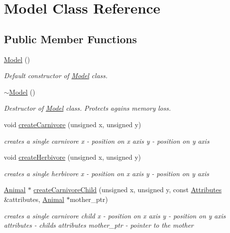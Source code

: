 \hypertarget{class_model}{}\section{Model Class Reference}
\label{class_model}
\subsection*{Public Member Functions}
\begin{DoxyCompactItemize}
\item 
\hyperlink{class_model_ae3b375de5f6df4faf74a95d64748e048}{Model} ()
\begin{DoxyCompactList}\small\item\em Default constructor of \hyperlink{class_model}{Model} class. \end{DoxyCompactList}\item 
\hyperlink{class_model_ad6ebd2062a0b823db841a0b88baac4c0}{$\sim$\+Model} ()
\begin{DoxyCompactList}\small\item\em Destructor of \hyperlink{class_model}{Model} class. Protects agains memory loss. \end{DoxyCompactList}\item 
void \hyperlink{class_model_aa6ac184b9cbcceddbe5a44c97cfdd618}{create\+Carnivore} (unsigned x, unsigned y)
\begin{DoxyCompactList}\small\item\em creates a single carnivore  x -\/ position on x axis  y -\/ position on y axis \end{DoxyCompactList}\item 
void \hyperlink{class_model_a26eee2f12fc902ea98e53001c0d1c4ea}{create\+Herbivore} (unsigned x, unsigned y)
\begin{DoxyCompactList}\small\item\em creates a single herbivore  x -\/ position on x axis  y -\/ position on y axis \end{DoxyCompactList}\item 
\hyperlink{class_animal}{Animal} $\ast$ \hyperlink{class_model_a8b359acfc61eb24f4b005a8782970616}{create\+Carnivore\+Child} (unsigned x, unsigned y, const \hyperlink{class_attributes}{Attributes} \&attributes, \hyperlink{class_animal}{Animal} $\ast$mother\+\_\+ptr)
\begin{DoxyCompactList}\small\item\em creates a single carnivore child  x -\/ position on x axis  y -\/ position on y axis  attributes -\/ child\textquotesingle{}s attributes  mother\+\_\+ptr -\/ pointer to the mother \end{DoxyCompactList}\item 

\end{DoxyCompactItemize}
